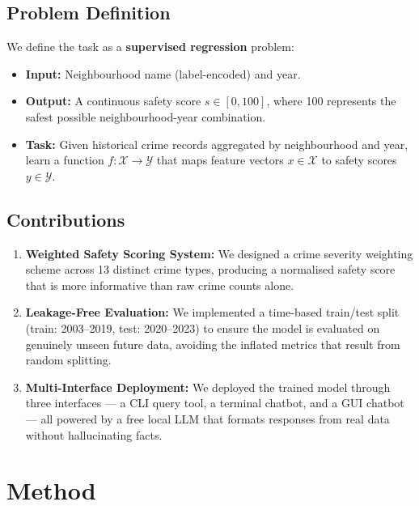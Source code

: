 \documentclass{article}
\begin{document}
\subsection{Problem Definition}
We define the task as a \textbf{supervised regression} problem:

\begin{itemize}[leftmargin=*]
  \item \textbf{Input:} Neighbourhood name (label-encoded) and year.
  \item \textbf{Output:} A continuous safety score $s \in [0, 100]$, where 100
        represents the safest possible neighbourhood-year combination.
  \item \textbf{Task:} Given historical crime records aggregated by neighbourhood
        and year, learn a function $f: \mathcal{X} \rightarrow \mathcal{Y}$ that
        maps feature vectors $x \in \mathcal{X}$ to safety scores
        $y \in \mathcal{Y}$.
\end{itemize}

\subsection{Contributions}
\begin{enumerate}[leftmargin=*]
  \item \textbf{Weighted Safety Scoring System:} We designed a crime severity
        weighting scheme across 13 distinct crime types, producing a normalised
        safety score that is more informative than raw crime counts alone.
  \item \textbf{Leakage-Free Evaluation:} We implemented a time-based train/test
        split (train: 2003--2019, test: 2020--2023) to ensure the model is
        evaluated on genuinely unseen future data, avoiding the inflated metrics
        that result from random splitting.
  \item \textbf{Multi-Interface Deployment:} We deployed the trained model through
        three interfaces --- a CLI query tool, a terminal chatbot, and a GUI
        chatbot --- all powered by a free local LLM that formats responses from
        real data without hallucinating facts.
\end{enumerate}

\section{Method}
\end{document}
